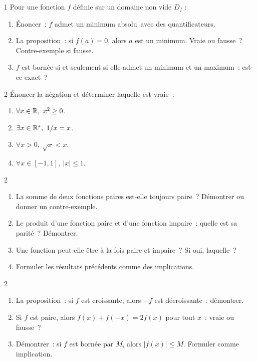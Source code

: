 \begin{bilan}
\begin{exo}{1}
Pour une fonction $f$ d\'efinie sur un domaine non vide $D_f$ :
\begin{enumerate}
  \item \'Enoncer~: \og $f$ admet un minimum absolu\fg\ avec des quantificateurs.
  \item La proposition~: \og si $f(a)=0$, alors $a$ est un minimum\fg.
        Vraie ou fausse~? Contre-exemple si fausse.
  \item \og $f$ est born\'ee si et seulement si elle admet un minimum
        et un maximum\fg~: est-ce exact~?
\end{enumerate}
\end{exo}

\begin{exo}{2}
\'Enoncer la n\'egation et d\'eterminer laquelle est vraie~:
\begin{enumerate}
  \item $\forall x\in\R,\ x^2\geq0$.
  \item $\exists x\in\R^*,\ 1/x=x$.
  \item $\forall x>0,\ \sqrt{x}<x$.
  \item $\forall x\in[-1,1],\ |x|\leq1$.
\end{enumerate}
\end{exo}

\begin{exo}{2}
\begin{enumerate}
  \item La somme de deux fonctions paires est-elle toujours paire~?
        D\'emontrer ou donner un contre-exemple.
  \item Le produit d'une fonction paire et d'une fonction impaire~:
        quelle est sa parit\'e~? D\'emontrer.
  \item Une fonction peut-elle \^etre \`a la fois paire et impaire~?
        Si oui, laquelle~?
  \item Formuler les r\'esultats pr\'ec\'edents comme des implications.
\end{enumerate}
\end{exo}

\begin{exo}{2}
\begin{enumerate}
  \item La proposition~: \og si $f$ est croissante, alors $-f$ est d\'ecroissante\fg~:
        d\'emontrer.
  \item \og Si $f$ est paire, alors $f(x)+f(-x)=2f(x)$ pour tout $x$\fg~:
        vraie ou fausse~?
  \item D\'emontrer~: si $f$ est born\'ee par $M$, alors $|f(x)|\leq M$.
        Formuler comme implication.
\end{enumerate}
\end{exo}


\end{bilan}
